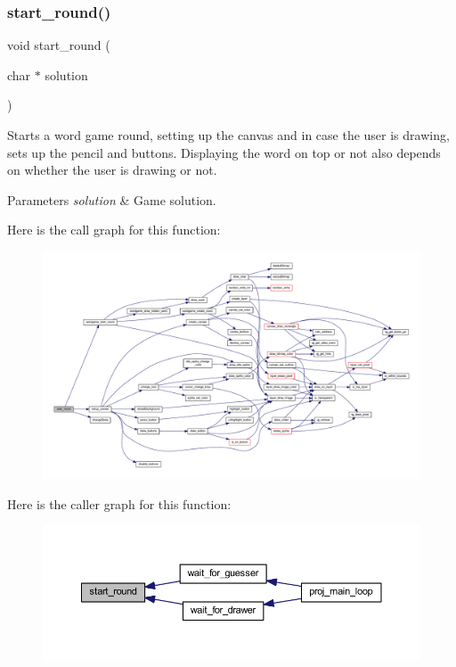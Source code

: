 \subsubsection{\texorpdfstring{start\+\_\+round()}{start\_round()}}
{\footnotesize\ttfamily void start\+\_\+round (\begin{DoxyParamCaption}\item[{char $\ast$}]{solution }\end{DoxyParamCaption})}



Starts a word game round, setting up the canvas and in case the user is drawing, sets up the pencil and buttons. Displaying the word on top or not also depends on whether the user is drawing or not. 


\begin{DoxyParams}{Parameters}
{\em solution} & Game solution. \\
\hline
\end{DoxyParams}
Here is the call graph for this function\+:\nopagebreak
\begin{figure}[H]
\begin{center}
\leavevmode
\includegraphics[width=350pt]{group__pengoo_ga02cb99bd23a1083281e874b3b4ebbad5_cgraph}
\end{center}
\end{figure}
Here is the caller graph for this function\+:\nopagebreak
\begin{figure}[H]
\begin{center}
\leavevmode
\includegraphics[width=350pt]{group__pengoo_ga02cb99bd23a1083281e874b3b4ebbad5_icgraph}
\end{center}
\end{figure}
\mbox{\label{group__pengoo_gadeb18b17fc386f53c77fbcd19dc7a8e6}} 
